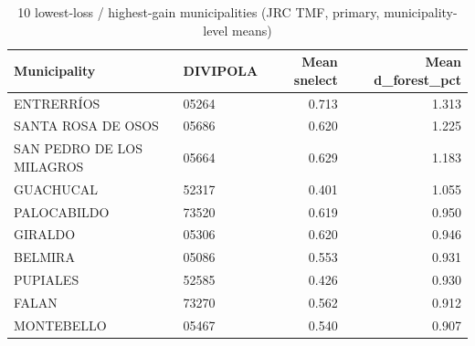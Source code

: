 \begin{table}

\caption{10 lowest-loss / highest-gain municipalities (JRC TMF, primary, municipality-level means)}
\centering
\begin{tabular}[t]{llrr}
\toprule
Municipality & DIVIPOLA & Mean snelect & Mean d\_forest\_pct\\
\midrule
ENTRERRÍOS & 05264 & 0.713 & 1.313\\
SANTA ROSA DE OSOS & 05686 & 0.620 & 1.225\\
SAN PEDRO DE LOS MILAGROS & 05664 & 0.629 & 1.183\\
GUACHUCAL & 52317 & 0.401 & 1.055\\
PALOCABILDO & 73520 & 0.619 & 0.950\\
\addlinespace
GIRALDO & 05306 & 0.620 & 0.946\\
BELMIRA & 05086 & 0.553 & 0.931\\
PUPIALES & 52585 & 0.426 & 0.930\\
FALAN & 73270 & 0.562 & 0.912\\
MONTEBELLO & 05467 & 0.540 & 0.907\\
\bottomrule
\end{tabular}
\end{table}
